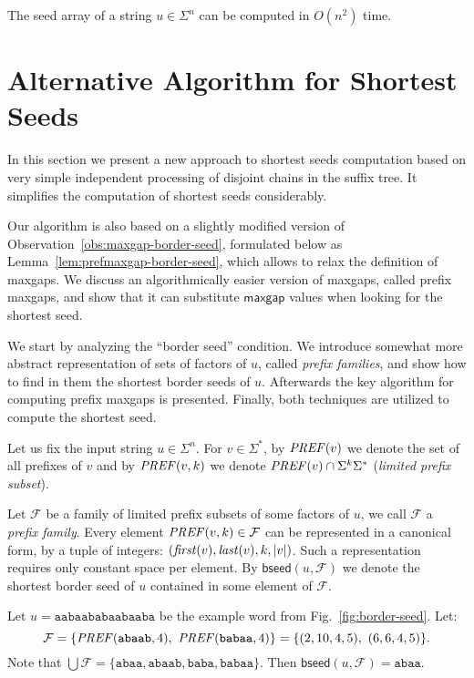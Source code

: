 \documentclass{llncs}
\newcommand{\bseed}{\textsf{bseed}}
\newcommand{\firstocc}{\mbox{\textit{first}}}
\newcommand{\lastocc}{\mbox{\textit{last}}}
\newcommand{\FF}{\mathcal{F}}
\newcommand{\maxgap}{\textsf{maxgap}}
\newcommand{\PREF}{\mbox{\textit{PREF}}}
\begin{document}
  \begin{theorem}
    The seed array of a string $u \in \Sigma^n$ can be computed in $O(n^2)$ time.
  \end{theorem}







  \section{Alternative Algorithm for Shortest Seeds}\label{sec:new-seeds}
    In this section we present a new approach to shortest seeds computation
    based on very simple independent processing of disjoint chains in the suffix tree.
    It simplifies the computation of shortest seeds considerably.

    Our algorithm is also based on a slightly modified version of Observation~\ref{obs:maxgap-border-seed},
    formulated below as Lemma~\ref{lem:prefmaxgap-border-seed}, which allows to relax the definition of maxgaps.
    We discuss an algorithmically easier version of maxgaps, called prefix maxgaps, 
    and show that it can substitute $\maxgap$ values when looking for the shortest seed. 
    
    We start by analyzing the ``border seed'' condition.
    We introduce somewhat more abstract representation of sets of factors of $u$, 
    called \emph{prefix families}, and show how to find in them the shortest border seeds of $u$. 
    Afterwards the key algorithm for computing prefix maxgaps is presented.
    Finally, both techniques are utilized to compute the shortest seed. 

    Let us fix the input string $u \in \Sigma^n$.
    For $v \in \Sigma^*$, by $\PREF(v)$ we denote the set of all prefixes of $v$
    and by $\PREF(v,k)$ we denote $\PREF(v) \cap \Sigma^k\Sigma^*$ (\emph{limited prefix subset}).

    Let $\FF$ be a family of limited prefix subsets of some factors of $u$, we call $\FF$ a \emph{prefix family}.
    Every element $\PREF(v,k) \in \FF$ can be represented in a canonical form, by
    a tuple of integers: $(\firstocc(v), \lastocc(v), k, |v|)$.
    Such a representation requires only constant space per element.
    By $\bseed(u,\FF)$ we denote the shortest border seed of $u$ contained in some 
    element of $\FF$.

    \begin{example}
      Let $u = \mathtt{aabaababaabaaba}$ be the example word from Fig.~\ref{fig:border-seed}.
      Let:
      $$
        \FF = 
        \{\PREF(\mathtt{abaab},4),\ \PREF(\mathtt{babaa},4)\} =
        \{(2,10,4,5),\ (6,6,4,5)\}.
      $$
      Note that $\bigcup\FF = \{\mathtt{abaa},\mathtt{abaab},\mathtt{baba},\mathtt{babaa}\}$.
      Then $\bseed(u,\FF) = \mathtt{abaa}$.
    \end{example}
\end{document}
